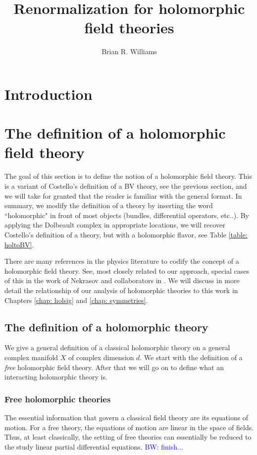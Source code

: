 \documentclass[10pt]{article}
\title{Renormalization for holomorphic field theories}
\author{Brian R. Williams}
\def\brian{\textcolor{blue}{BW: }\textcolor{blue}}
\begin{document}
\maketitle

\section{Introduction}

\section{The definition of a holomorphic field theory}

The goal of this section is to define the notion of a holomorphic field theory. 
This is a variant of Costello's definition of a BV theory, see the previous section, and we will take for granted that the reader is familiar with the general format.
In summary, we modify the definition of a theory by inserting the word ``holomorphic" in front of most objects (bundles, differential operators, etc..).
By applying the Dolbeault complex in appropriate locations, we will recover Costello's definition of a theory, but with a holomorphic flavor, see Table \ref{table: holtoBV}. 

There are many references in the physics literature to codify the concept of a holomorphic field theory.
See, most closely related to our approach, special cases of this in the work of Nekrasov and collaborators in \cite{NekThesis, NekChiral, NekCFT}. 
We will discuss in more detail the relationship of our analysis of holomorphic theories to this work in Chapters \ref{chap: holsig} and \ref{chap: symmetries}. 

\subsection{The definition of a holomorphic theory}

We give a general definition of a classical holomorphic theory on a general complex manifold $X$ of complex dimension $d$.
We start with the definition of a {\em free} holomorphic field theory. 
After that we will go on to define what an interacting holomorphic theory is.

\subsubsection{Free holomorphic theories}

The essential information that govern a classical field theory are its equations of motion. 
For a free theory, the equations of motion are linear in the space of fields.
Thus, at least classically, the setting of free theories can essentially be reduced to the study linear partial differential equations.
\brian{finish...}
\end{document}
